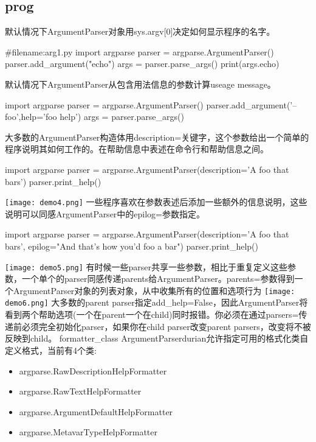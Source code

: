 \subsection{prog}
默认情况下ArgumentParser对象用sys.argv[0]决定如何显示程序的名字。
\begin{python}
#filename:arg1.py
import argparse
parser = argparse.ArgumentParser()
parser.add_argument("echo")
args = parser.parse_args()
print(args.echo)
\end{python}
默认情况下ArgumentParser从包含用法信息的参数计算useage message。
\begin{python}
import argparse
parser = argparse.ArgumentParser()
parser.add_argument('--foo',help='foo help')
args = parser.parse_args()
\end{python}

\begin{figure}[htbp]
\centering
{}
\label{fig:1}
\end{figure}
大多数的ArgumentParser构造体用description=关键字，这个参数给出一个简单的程序说明其如何工作的。在帮助信息中表述在命令行和帮助信息之间。
\begin{python}
import argparse
parser = argparse.ArgumentParser(description='A foo that bars')
parser.print_help()
\end{python}
\texttt{[image: demo4.png]}\newline
一些程序喜欢在参数表述后添加一些额外的信息说明，这些说明可以同感ArgumentParser中的epilog=参数指定。
\begin{python}
import argparse
parser = argparse.ArgumentParser(description='A foo that bars',
epilog="And that's how you'd foo a bar")
parser.print_help()
\end{python}
\texttt{[image: demo5.png]}
有时候一些parser共享一些参数，相比于重复定义这些参数，一个单个的parser同感传递parents给ArgumentParser。parents=参数得到一个ArgumentParser对象的列表对象，从中收集所有的位置和选项行为\newline
\texttt{[image: demo6.png]}\newline
大多数的parent parser指定add\_help=False，因此ArgumentParser将看到两个帮助选项(一个在parent一个在child)同时报错。你必须在通过parsers=传递前必须完全初始化parser，如果你在child parser改变parent parsers，改变将不被反映到child。
formatter\_class
ArgumentParserdurian允许指定可用的格式化类自定义格式，当前有4个类:
\begin{itemize}
\item argparse.RawDescriptionHelpFormatter
\item argparse.RawTextHelpFormatter
\item argparse.ArgumentDefaultHelpFormatter
\item argparse.MetavarTypeHelpFormatter
\end{itemize}

